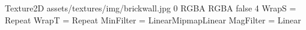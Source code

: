 Texture2D
assets/textures/img/brickwall.jpg
0
RGBA
RGBA
false
4
WrapS = Repeat
WrapT = Repeat
MinFilter = LinearMipmapLinear
MagFilter = Linear